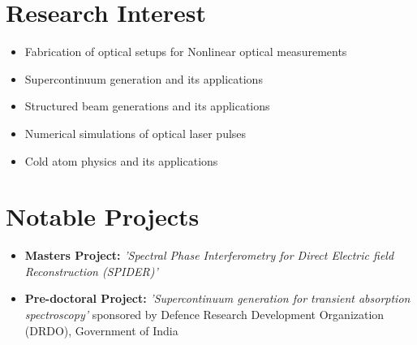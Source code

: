 \documentclass[11pt,a4paper,sans]{moderncv}        %
\begin{document}
\section{Research Interest}

\begin{itemize}
	\item{Fabrication of optical setups for Nonlinear optical measurements}
	\vspace{6pt}
	
	\item{Supercontinuum generation and its applications}
	\vspace{6pt}
	
	\item{Structured beam generations and its applications}
	\vspace{6pt}
	
	\item{Numerical simulations of optical laser pulses}
	
	\vspace{6pt}
	\item{Cold atom physics and its applications}
\end{itemize}

\section{Notable Projects}

\vspace{5pt}

\begin{itemize}

\item{\textbf{Masters Project:} \textit{'Spectral Phase Interferometry for Direct Electric field Reconstruction (SPIDER)'}}

\vspace{6pt}

\item{\textbf{Pre-doctoral Project:} \textit{'Supercontinuum generation for transient absorption spectroscopy'} sponsored by Defence Research Development Organization (DRDO), Government of India}

\end{itemize}
\end{document}
